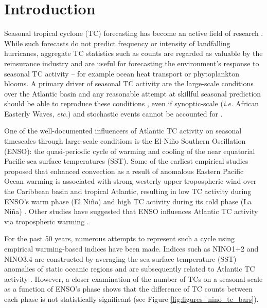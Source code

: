 \section{Introduction}
Seasonal tropical cyclone (TC) forecasting has become an active field of research \cite{elsner1993, elsner1998, elsner2008, klotzbach2009}. While such forecasts do not predict frequency or intensity of landfalling hurricanes, aggregate TC statistics such as counts are regarded as valuable by the reinsurance industry and are useful for forecasting the environment's response to seasonal TC activity -- for example ocean heat transport or phytoplankton blooms. A primary driver of seasonal TC activity are the large-scale conditions over the Atlantic basin and any reasonable attempt at skillful seasonal prediction should be able to reproduce these conditions \cite{gray1968}, even if synoptic-scale (\emph{i.e.} African Easterly Waves, \emph{etc.}) and stochastic events cannot be accounted for \cite{Knutson2007, Emanuel2008Simulation}.

One of the well-documented influencers of Atlantic TC activity on seasonal timescales through large-scale conditions is the El-Ni\~no Southern Oscillation (ENSO): the quasi-periodic cycle of warming and cooling of the near equatorial Pacific sea surface temperatures (SST). Some of the earliest empirical studies proposed that enhanced convection as a result of anomalous Eastern Pacific Ocean warming is associated with strong westerly upper tropospheric wind over the Caribbean basin and tropical Atlantic, resulting in low TC activity during ENSO's warm phase (El Ni\~no) and high TC activity during its cold phase (La Ni\~na) \cite{gray1984a}. Other studies have suggested that ENSO influences Atlantic TC activity via tropospheric warming \cite{tang2004}.

For the past 50 years, numerous attempts to represent such a cycle using empirical warming-based indices have been made. Indices such as NINO1+2 and NINO3.4 are constructed by averaging the sea surface temperature (SST) anomalies of static oceanic regions and are subsequently related to Atlantic TC activity \cite{trenberth1997definition}. However, a closer examination of the number of TCs on a seasonal-scale as a function of ENSO's phase shows that the difference of TC counts between each phase is not statistically significant (see Figure \ref{fig:figures_nino_tc_bars}).




